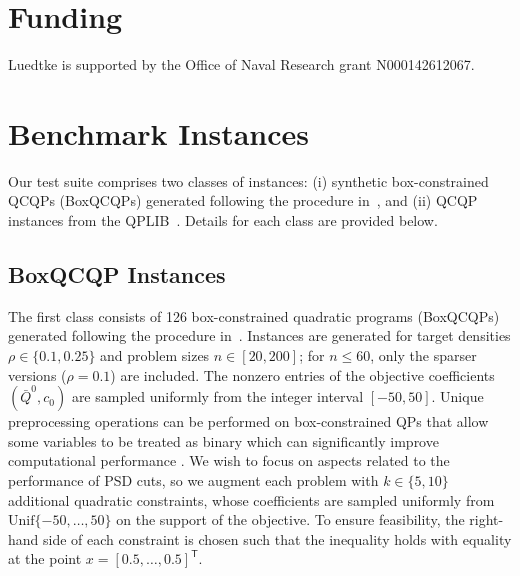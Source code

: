 \documentclass[twoside]{article}
\begin{document}
	
	


	
	\section*{Funding}
	Luedtke is supported by the Office of Naval Research grant N000142612067.
	
	
	\newpage
	\appendix
	\renewcommand{\thesection}{Appendix~\Alph{section}}
	\titleformat{\section}{\normalfont\Large\bfseries}{\thesection:}{1em}{}
	
	
	\section{Benchmark Instances}
	\label{A:instances}
	Our test suite comprises two classes of instances: (i) synthetic box-constrained QCQPs (BoxQCQPs) generated following the procedure in~\cite{burer:10}, and (ii) QCQP instances from the QPLIB~\cite{furini2019qplib}. Details for each class are provided below.
	
	
	
	
	
	\subsection*{BoxQCQP Instances}
	The first class consists of 126 box-constrained quadratic programs (BoxQCQPs) generated following the procedure in~\cite{burer:10}. Instances are generated for target densities $\rho \in \{0.1, 0.25\}$ and problem sizes $n \in [20,200]$; for $n\leq 60$, only the sparser versions ($\rho = 0.1$) are included. The nonzero entries of the objective coefficients $(\bar{Q}^0, c_0)$ are sampled uniformly from the integer interval $[-50, 50]$.  Unique preprocessing operations can be performed on box-constrained QPs that allow some variables to be treated as binary which can significantly improve computational performance \cite{bonami.gunluk.linderoth:18}.  We wish to focus on aspects related to the performance of PSD cuts, so we augment each problem with $k \in \{5, 10\}$ additional quadratic constraints, whose coefficients are sampled uniformly from $\mathrm{Unif}\{-50, \dots, 50\}$ on the support of the objective. To ensure feasibility, the right-hand side of each constraint is chosen such that the inequality holds with equality at the point $x = [0.5, \dots, 0.5]^{\mathsf T}$.  
	
\end{document}

